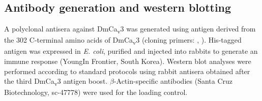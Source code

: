 \subsection*{Antibody generation and western blotting}

A polyclonal antisera against DmCa\textsubscript{v}3 was generated using antigen derived from the 302 C-terminal amino acids of DmCa\textsubscript{v}3 (cloning primers: , ).
His-tagged antigen was expressed in \emph{E. coli}, purified and injected into rabbits to generate an immune response (YoungIn Frontier, South Korea).
Western blot analyses were performed according to standard protocols using rabbit antisera obtained after the third DmCa\textsubscript{v}3 antigen boost.
$\beta$-Actin-specific antibodies (Santa Cruz Biotechnology, sc-47778) were used for the loading control.
